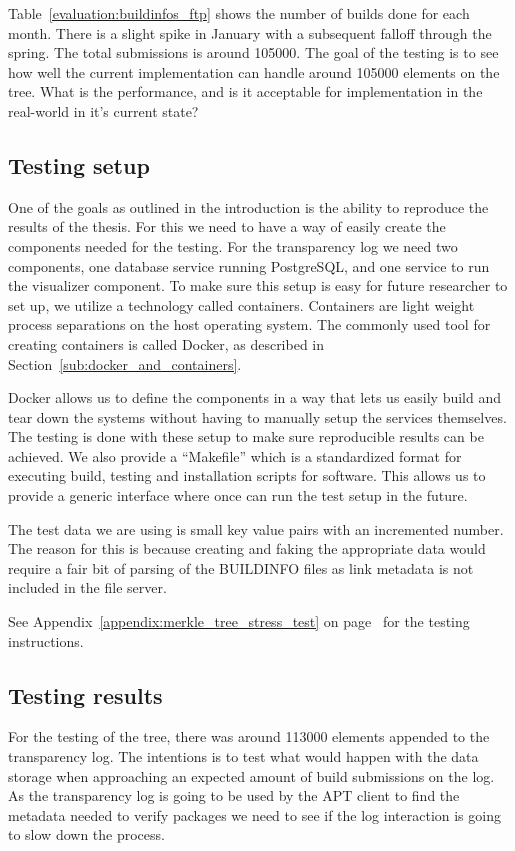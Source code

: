 \documentclass[../Main/thesis.tex]{subfiles}
\begin{document}
Table~\ref{evaluation:buildinfos_ftp} shows the number of builds done for each
month. There is a slight spike in January with a subsequent falloff through the
spring. The total submissions is around 105000. The goal of the testing is to
see how well the current implementation can handle around 105000 elements on the
tree. What is the performance, and is it acceptable for implementation in the
real-world in it's current state?
 
\subsection*{Testing setup}%
\label{sub:testing_setup}
One of the goals as outlined in the introduction is the ability to reproduce the
results of the thesis. For this we need to have a way of easily create the
components needed for the testing. For the transparency log we need two
components, one database service running PostgreSQL, and one service to run the
visualizer component. To make sure this setup is easy for future researcher to
set up, we utilize a technology called containers. Containers are light weight
process separations on the host operating system. The commonly used tool for
creating containers is called Docker, as described
in Section~\ref{sub:docker_and_containers}.

Docker allows us to define the components in a way that lets us easily build and
tear down the systems without having to manually setup the services themselves.
The testing is done with these setup to make sure reproducible results can be
achieved. We also provide a ``Makefile'' which is a standardized format for
executing build, testing and installation scripts for software. This allows us
to provide a generic interface where once can run the test setup in the future.

The test data we are using is small key value pairs with an incremented number.
The reason for this is because creating and faking the appropriate data would
require a fair bit of parsing of the BUILDINFO files as link metadata is not
included in the file server.

See Appendix~\ref{appendix:merkle_tree_stress_test} on
page~\pageref{appendix:merkle_tree_stress_test} for the testing instructions.

\subsection*{Testing results}%
\label{sub:testing_results}
For the testing of the tree, there was around 113000 elements appended to the
transparency log. The intentions is to test what would happen with the data
storage when approaching an expected amount of build submissions on the log.
As the transparency log is going to be used by the APT client to find the
metadata needed to verify packages we need to see if the log interaction is
going to slow down the process.
\end{document}
